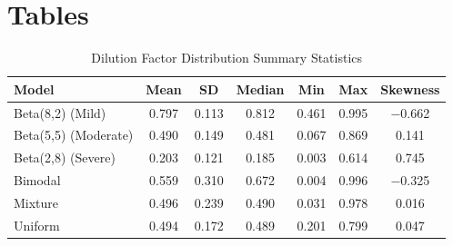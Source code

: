 \documentclass[12pt]{article}
\begin{document}
\newpage

\section*{Tables}

\begin{table}[ht!]
\centering
\caption{Dilution Factor Distribution Summary Statistics}
\label{tab:dilution_stats}
\begin{tabular}{lcccccc}
\toprule
Model & Mean & SD & Median & Min & Max & Skewness \\
\midrule
Beta(8,2) (Mild) & 0.797 & 0.113 & 0.812 & 0.461 & 0.995 & $-$0.662 \\
Beta(5,5) (Moderate) & 0.490 & 0.149 & 0.481 & 0.067 & 0.869 & 0.141 \\
Beta(2,8) (Severe) & 0.203 & 0.121 & 0.185 & 0.003 & 0.614 & 0.745 \\
Bimodal & 0.559 & 0.310 & 0.672 & 0.004 & 0.996 & $-$0.325 \\
Mixture & 0.496 & 0.239 & 0.490 & 0.031 & 0.978 & 0.016 \\
Uniform & 0.494 & 0.172 & 0.489 & 0.201 & 0.799 & 0.047 \\
\bottomrule
\end{tabular}
\end{table}
\end{document}
